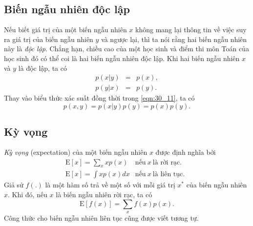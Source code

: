 


\subsection{Biến ngẫu nhiên độc lập}
Nếu biết giá trị của một biến ngẫu nhiên $x$ không mang lại thông tin về việc
suy ra giá trị của biến ngẫu nhiên $y$ và ngược lại, thì ta nói rằng hai biến
ngẫu nhiên này là \textit{độc lập}. Chẳng hạn, chiều cao của một học sinh và
điểm thi môn Toán của học sinh đó có thể coi là hai biến ngẫu nhiên {độc lập}.
Khi hai biến ngẫu nhiên $x$ và $y$ là {độc lập}, ta  có%
\begin{eqnarray}
\label{eqn:30_18}
  p(x | y) &=& p(x),  \\
\label{eqn:30_19}
  p(y | x) &=& p(y).
\end{eqnarray}
Thay vào biểu thức xác suất đồng thời trong \eqref{eqn:30_11}, ta có
\begin{equation}
\label{eqn:30_20}
  p(x, y) = p(x | y) p(y) = p(x) p(y).
\end{equation}


\subsection{Kỳ vọng}
\label{sub:expectaion_covariance}
\textit{Kỳ vọng} (expectation) của một biến ngẫu nhiên $x$ được định nghĩa bởi%
\begin{eqnarray}
\label{eqn:30_21}
  \text{E}[x] = \sum_x x p(x)  & \text{nếu}~ x ~ \text{là rời rạc.} \quad
  \\
\label{eqn:30_22}
  \text{E}[x] = \int x p(x) dx  & \text{nếu}~ x ~ \text{là liên tục.}
\end{eqnarray}
Giả sử $f(.)$ là một hàm số trả về một số với mỗi giá trị $x^*$ của biến ngẫu
nhiên $x$. Khi đó, nếu $x$ là biến ngẫu nhiên rời rạc, ta có
\begin{equation}
\label{eqn:30_23}
  \text{E}[f(x)] = \sum_x f(x) p(x).
\end{equation}
Công thức cho biến ngẫu nhiên liên tục cũng được viết tương tự.

